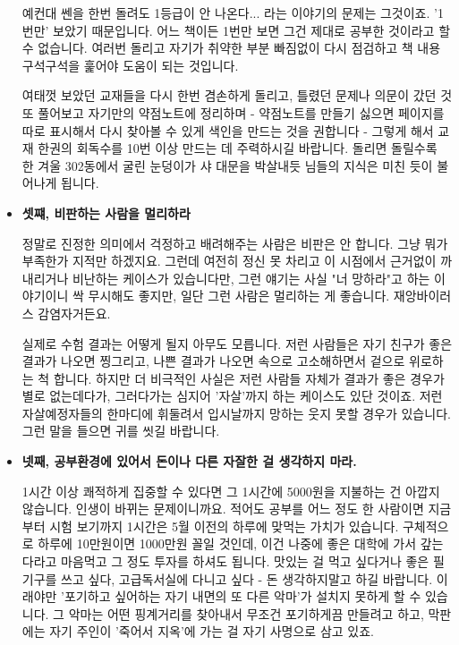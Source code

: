 \begin{itemize}
    예컨대 쎈을 한번 돌려도 1등급이 안 나온다... 라는 이야기의 문제는 그것이죠. '1번만' 보았기 때문입니다.
    어느 책이든 1번만 보면 그건 제대로 공부한 것이라고 할 수 없습니다. 여러번 돌리고 자기가 취약한 부분 빠짐없이 다시 점검하고
    책 내용 구석구석을 훑어야 도움이 되는 것입니다.
    \vspace{5mm}

    여태껏 보았던 교재들을 다시 한번 겸손하게 돌리고, 틀렸던 문제나 의문이 갔던 것 또 풀어보고 자기만의 약점노트에 정리하며
    - 약점노트를 만들기 싫으면 페이지를 따로 표시해서 다시 찾아볼 수 있게 색인을 만드는 것을 권합니다 -
    그렇게 해서 교재 한권의 회독수를 10번 이상 만드는 데 주력하시길 바랍니다.
    돌리면 돌릴수록 한 겨울 302동에서 굴린 눈덩이가 샤 대문을 박살내듯 님들의 지식은 미친 듯이 불어나게 됩니다.
    \vspace{5mm}

    \item \textbf{셋쨰, 비판하는 사람을 멀리하라}
    \vspace{5mm}

    정말로 진정한 의미에서 걱정하고 배려해주는 사람은 비판은 안 합니다. 그냥 뭐가 부족한가 지적만 하겠지요.
    그런데 여전히 정신 못 차리고 이 시점에서 근거없이 까내리거나 비난하는 케이스가 있습니다만,
    그런 얘기는 사실 "너 망하라"고 하는 이야기이니 싹 무시해도 좋지만, 일단 그런 사람은 멀리하는 게 좋습니다. 재앙바이러스 감염자거든요.
    \vspace{5mm}

    실제로 수험 결과는 어떻게 될지 아무도 모릅니다.
    저런 사람들은 자기 친구가 좋은 결과가 나오면 찡그리고, 나쁜 결과가 나오면 속으로 고소해하면서 겉으로 위로하는 척 합니다.
    하지만 더 비극적인 사실은 저런 사람들 자체가 결과가 좋은 경우가 별로 없는데다가, 그러다가는 심지어 '자살'까지 하는 케이스도 있단 것이죠.
    저런 자살예정자들의 한마디에 휘둘려서 입시날까지 망하는 웃지 못할 경우가 있습니다.
    그런 말을 들으면 귀를 씻길 바랍니다.
    \vspace{5mm}

    \item  \textbf{넷째, 공부환경에 있어서 돈이나 다른 자잘한 걸 생각하지 마라.}
    \vspace{5mm}

    1시간 이상 쾌적하게 집중할 수 있다면 그 1시간에 5000원을 지불하는 건 아깝지 않습니다. 인생이 바뀌는 문제이니까요.
    적어도 공부를 어느 정도 한 사람이면 지금부터 시험 보기까지 1시간은 5월 이전의 하루에 맞먹는 가치가 있습니다.
    구체적으로 하루에 10만원이면 1000만원 꼴일 것인데, 이건 나중에 좋은 대학에 가서 갚는다라고 마음먹고 그 정도 투자를 하셔도 됩니다.
    맛있는 걸 먹고 싶다거나 좋은 필기구를 쓰고 싶다, 고급독서실에 다니고 싶다 - 돈 생각하지말고 하길 바랍니다.
    이래야만 '포기하고 싶어하는 자기 내면의 또 다른 악마'가 설치지 못하게 할 수 있습니다.
    그 악마는 어떤 핑계거리를 찾아내서 무조건 포기하게끔 만들려고 하고, 막판에는 자기 주인이 '죽어서 지옥'에 가는 걸 자기 사명으로 삼고 있죠.
    \vspace{5mm}


\end{itemize}
